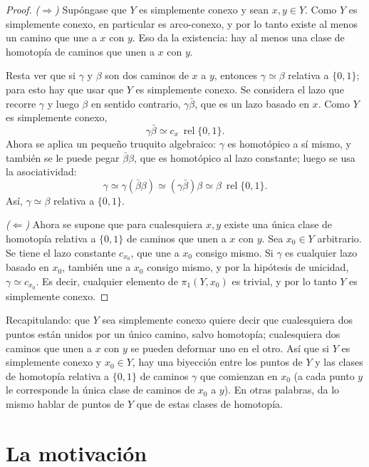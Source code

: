 \documentclass[11pt]{article}
\begin{document}
\begin{proof}
\emph{($\Rightarrow$)} Supóngase que $Y$ es simplemente conexo y sean $x,y\in Y$. Como $Y$ es simplemente conexo, en particular es arco-conexo, y por lo tanto existe al menos un camino que une a $x$ con $y$. Eso da la existencia: hay al menos una clase de homotopía de caminos que unen a $x$ con $y$.

Resta ver que si $\gamma$ y $\beta$ son dos caminos de $x$ a $y$, entonces $\gamma\simeq\beta$ relativa a $\{0,1\}$; para esto hay que usar que $Y$ es simplemente conexo. Se considera el lazo que recorre $\gamma$ y luego $\beta$ en sentido contrario, $\gamma\bar\beta$, que es un lazo basado en $x$. Como $Y$ es simplemente conexo,
\[
  \gamma\bar\beta\simeq c_x\ \operatorname{rel}\{0,1\}.
\]
Ahora se aplica un pequeño truquito algebraico: $\gamma$ es homotópico a sí mismo, y también se le puede pegar $\bar\beta\beta$, que es homotópico al lazo constante; luego se usa la asociatividad:
\[
  \gamma\simeq\gamma(\bar\beta\beta)\simeq(\gamma\bar\beta)\beta\simeq\beta\ \operatorname{rel}\{0,1\}.
\]
Así, $\gamma\simeq\beta$ relativa a $\{0,1\}$.

\medskip\noindent\emph{($\Leftarrow$)} Ahora se supone que para cualesquiera $x,y$ existe una única clase de homotopía relativa a $\{0,1\}$ de caminos que unen a $x$ con $y$. Sea $x_0\in Y$ arbitrario. Se tiene el lazo constante $c_{x_0}$, que une a $x_0$ consigo mismo. Si $\gamma$ es cualquier lazo basado en $x_0$, también une a $x_0$ consigo mismo, y por la hipótesis de unicidad, $\gamma\simeq c_{x_0}$. Es decir, cualquier elemento de $\pi_1(Y,x_0)$ es trivial, y por lo tanto $Y$ es simplemente conexo.
\end{proof}

Recapitulando: que $Y$ sea simplemente conexo quiere decir que cualesquiera dos puntos están unidos por un único camino, salvo homotopía; cualesquiera dos caminos que unen a $x$ con $y$ se pueden deformar uno en el otro. Así que si $Y$ es simplemente conexo y $x_0\in Y$, hay una biyección entre los puntos de $Y$ y las clases de homotopía relativa a $\{0,1\}$ de caminos $\gamma$ que comienzan en $x_0$ (a cada punto $y$ le corresponde la única clase de caminos de $x_0$ a $y$). En otras palabras, da lo mismo hablar de puntos de $Y$ que de estas clases de homotopía.

\section*{La motivación}
\end{document}
